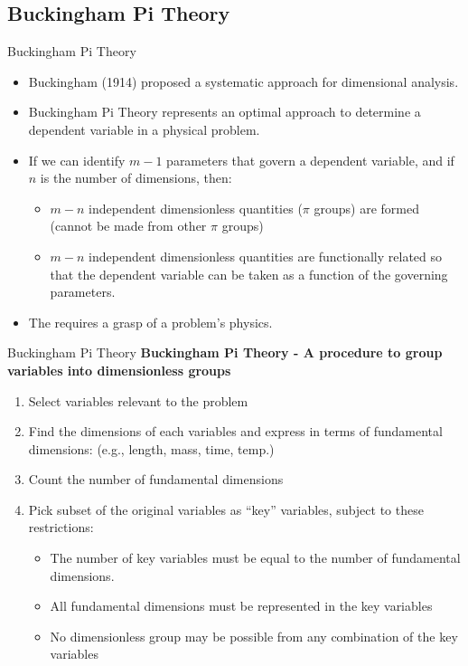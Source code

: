 \subsection{Buckingham Pi Theory}
\begin{frame}{Buckingham Pi Theory}
\begin{itemize}
	\item Buckingham (1914) proposed a systematic approach for dimensional analysis.
	\item Buckingham Pi Theory represents an optimal approach to determine a dependent variable in a physical problem.
	\item If we can identify $m-1$ parameters that govern a dependent variable, and if $n$ is the number of dimensions, then:
	\begin{itemize}
		\item $m-n$ independent dimensionless quantities ($\pi$ groups) are formed (cannot be made from other $\pi$ groups)
		\item $m-n$ independent dimensionless quantities are functionally related so that the dependent variable can be taken as a function of the governing parameters.
	\end{itemize}
	\item The requires a grasp of a problem's physics.
	\end{itemize}
\end{frame}
\begin{frame}{Buckingham Pi Theory}
\textbf{Buckingham Pi Theory - A procedure to group variables into dimensionless groups}
\begin{enumerate}
	\item Select variables relevant to the problem
	\item Find the dimensions of each variables and express in terms of fundamental dimensions: (e.g., length, mass, time, temp.)
	\item Count the number of fundamental dimensions
	\item Pick subset of the original variables as ``key'' variables, subject to these restrictions:
	\begin{itemize}
		\item The number of key variables must be equal to the number of fundamental dimensions.
		\item All fundamental dimensions must be represented in the key variables
		\item No dimensionless group may be possible from any combination of the key variables
	\end{itemize}
\end{enumerate}
\end{frame}
